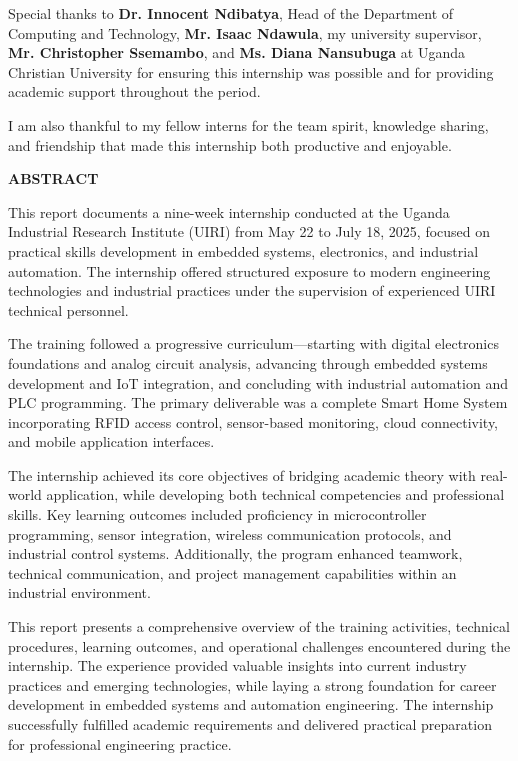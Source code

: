 \documentclass[12pt,a4paper]{report}
\begin{document}
\noindent Special thanks to \textbf{Dr. Innocent Ndibatya}, Head of the Department of Computing and Technology, \textbf{Mr. Isaac Ndawula}, my university supervisor, \textbf{Mr. Christopher Ssemambo}, and \textbf{Ms. Diana Nansubuga} at Uganda Christian University for ensuring this internship was possible and for providing academic support throughout the period.

\noindent I am also thankful to my fellow interns for the team spirit, knowledge sharing, and friendship that made this internship both productive and enjoyable.

\newpage
{\fontsize{14}{16.8}\selectfont\bfseries\centering ABSTRACT\par}
\vspace{10pt}
\noindent This report documents a nine-week internship conducted at the Uganda Industrial Research Institute (UIRI) from May 22 to July 18, 2025, focused on practical skills development in embedded systems, electronics, and industrial automation. The internship offered structured exposure to modern engineering technologies and industrial practices under the supervision of experienced UIRI technical personnel.

\noindent The training followed a progressive curriculum—starting with digital electronics foundations and analog circuit analysis, advancing through embedded systems development and IoT integration, and concluding with industrial automation and PLC programming. The primary deliverable was a complete Smart Home System incorporating RFID access control, sensor-based monitoring, cloud connectivity, and mobile application interfaces.

\noindent The internship achieved its core objectives of bridging academic theory with real-world application, while developing both technical competencies and professional skills. Key learning outcomes included proficiency in microcontroller programming, sensor integration, wireless communication protocols, and industrial control systems. Additionally, the program enhanced teamwork, technical communication, and project management capabilities within an industrial environment.

\noindent This report presents a comprehensive overview of the training activities, technical procedures, learning outcomes, and operational challenges encountered during the internship. The experience provided valuable insights into current industry practices and emerging technologies, while laying a strong foundation for career development in embedded systems and automation engineering. The internship successfully fulfilled academic requirements and delivered practical preparation for professional engineering practice.
\end{document}
